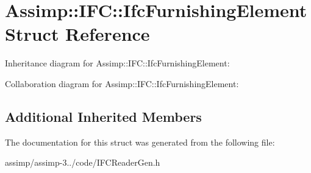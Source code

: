 \hypertarget{struct_assimp_1_1_i_f_c_1_1_ifc_furnishing_element}{\section{Assimp\+:\+:I\+F\+C\+:\+:Ifc\+Furnishing\+Element Struct Reference}
\label{struct_assimp_1_1_i_f_c_1_1_ifc_furnishing_element}
}


Inheritance diagram for Assimp\+:\+:I\+F\+C\+:\+:Ifc\+Furnishing\+Element\+:


Collaboration diagram for Assimp\+:\+:I\+F\+C\+:\+:Ifc\+Furnishing\+Element\+:
\subsection*{Additional Inherited Members}


The documentation for this struct was generated from the following file\+:\begin{DoxyCompactItemize}
\item 
assimp/assimp-\/3../code/I\+F\+C\+Reader\+Gen.\+h\end{DoxyCompactItemize}
